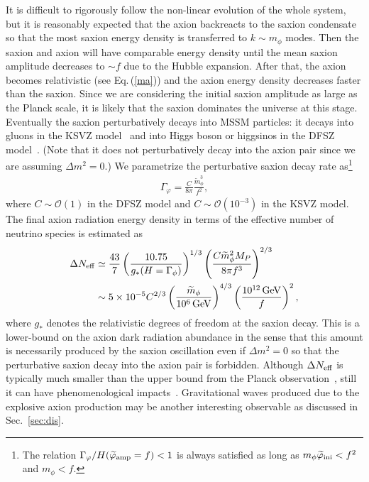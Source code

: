 \documentclass[12pt, a4paper]{article}
\begin{document}
It is difficult to rigorously follow the non-linear evolution of the whole system,
but it is reasonably expected that the axion backreacts to the saxion condensate so that 
the most saxion energy density is transferred to $k\sim m_\phi$ modes.
Then the saxion and axion will have comparable energy density until the mean saxion amplitude decreases to $\sim f$
due to the Hubble expansion.
After that, the axion becomes relativistic (see Eq.\,(\ref{ma})) and the axion energy density decreases faster than the saxion.
Since we are considering the initial saxion amplitude as large as the Planck scale, 
it is likely that the saxion dominates the universe at this stage.
Eventually the saxion perturbatively decays into MSSM particles: it decays into gluons in the KSVZ model~\cite{Kim:1979if} and into Higgs boson or higgsinos in the DFSZ model~\cite{Dine:1981rt}.
(Note that it does not perturbatively decay into the axion pair since we are assuming $\Delta m^2=0$.)
We parametrize the perturbative saxion decay rate as\footnote{
	The relation $\Gamma_\varphi / H( \widetilde\varphi_{\rm amp}=f) < 1$ is always satisfied
	as long as $m_\phi \widetilde\varphi_{\rm ini} < f^2$ and $m_\phi < f$.
}
\begin{align}
	\Gamma_\varphi = \frac{C}{8\pi} \frac{\widetilde{m}_\phi^3}{f^2},
\end{align}
where $C \sim \mathcal O(1)$ in the DFSZ model and $C\sim \mathcal O(10^{-3})$ in the KSVZ model.
The final axion radiation energy density in terms of the effective number of neutrino species is estimated as
\begin{align}
	\Delta N_{\rm eff} &\simeq \frac{43}{7}\left( \frac{10.75}{g_*(H=\Gamma_\phi)} \right)^{1/3}
	\left( \frac{C\widetilde{m}_\phi^2 M_P}{8\pi f^3} \right)^{2/3}\\
	& \sim 5\times 10^{-5} C^{2/3} \left( \frac{\widetilde{m}_\phi}{10^6\,{\rm GeV}} \right)^{4/3}
	\left( \frac{10^{12}\,{\rm GeV}}{f} \right)^{2},
	\label{Neff}
\end{align}
where $g_*$ denotes the relativistic degrees of freedom at the saxion decay.
This is a lower-bound on the axion dark radiation abundance in the sense that this amount is necessarily produced by the saxion oscillation
even if $\Delta m^2=0$ so that the perturbative saxion decay into the axion pair is forbidden.
Although $\Delta N_{\rm eff}$ is typically much smaller than the upper bound from the Planck observation~\cite{Ade:2015xua}, 
still it can have phenomenological impacts~\cite{Conlon:2013isa,Conlon:2013txa,Cicoli:2014bfa,Higaki:2013qka,Evoli:2016zhj}.
Gravitational waves produced due to the explosive axion production 
may be another interesting observable as discussed in Sec.~\ref{sec:dis}.
\end{document}
